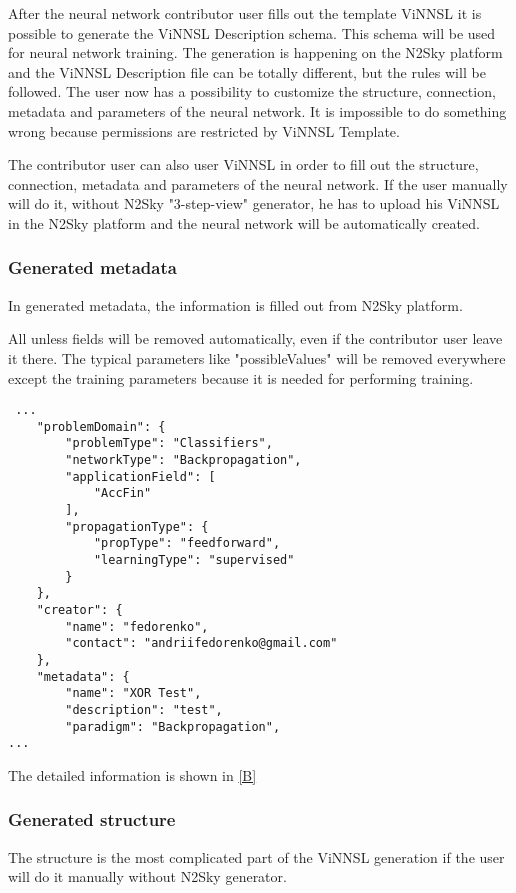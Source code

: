 After the neural network contributor user fills out the template ViNNSL it is possible to generate the ViNNSL Description schema. This schema will be used for neural network training. The generation is happening  on the N2Sky platform and the ViNNSL Description file can be totally different, but the rules will be followed. The user now has a possibility to customize the structure, connection, metadata and parameters of the neural network. It is impossible to do something wrong because permissions are restricted by ViNNSL Template. 

The contributor user can also user ViNNSL in order to fill out the structure, connection, metadata and parameters of the neural network. If the user manually will do it, without N2Sky "3-step-view" generator, he has to upload his ViNNSL in the N2Sky platform and the neural network will be automatically created. 

\subsubsection{Generated metadata}\label{Generated metadata}

In generated metadata, the information is filled out from N2Sky platform.

All unless fields will be removed automatically, even if the contributor user leave it there. The typical parameters like "possibleValues" will be removed everywhere except the training parameters because it is needed for performing training.

 \begin{lstlisting}
 ...
	"problemDomain": {
		"problemType": "Classifiers",
		"networkType": "Backpropagation",
		"applicationField": [
			"AccFin"
		],
		"propagationType": {
			"propType": "feedforward",
			"learningType": "supervised"
		}
	},
	"creator": {
		"name": "fedorenko",
		"contact": "andriifedorenko@gmail.com"
	},
	"metadata": {
		"name": "XOR Test",
		"description": "test",
		"paradigm": "Backpropagation",
...
\end{lstlisting}

The detailed information is shown in \autoref{B}

\subsubsection{Generated structure}\label{Generated structure}

The structure is the most complicated part of the ViNNSL generation if the user will do it manually without N2Sky generator. 

